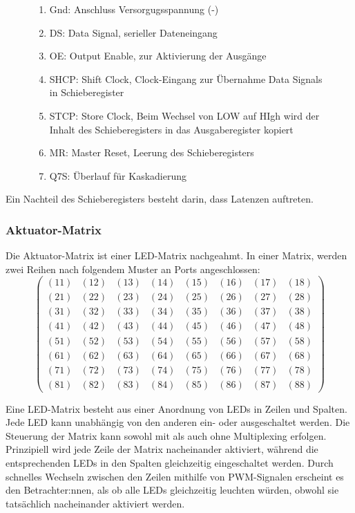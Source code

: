 \begin{figure}[htbp]
\begin{minipage}{0.6\textwidth}
\begin{enumerate}
		\item Gnd: Anschluss Versorgugsspannung (-)
		\item DS: Data Signal, serieller Dateneingang
		\item OE: Output Enable, zur Aktivierung der Ausgänge
		\item SHCP: Shift Clock, Clock-Eingang zur Übernahme Data Signals in Schieberegister
		\item STCP: Store Clock, Beim Wechsel von LOW auf HIgh wird der Inhalt des Schieberegisters in das Ausgaberegister kopiert %
		\item MR: Master Reset, Leerung des Schieberegisters
		\item Q7S: Überlauf für Kaskadierung
	\end{enumerate}
\end{minipage}
\end{figure}
Ein Nachteil des Schieberegisters besteht darin, dass Latenzen auftreten.
\subsubsection{Aktuator-Matrix} %
Die Aktuator-Matrix ist einer LED-Matrix nachgeahmt.
In einer Matrix, werden zwei Reihen nach folgendem Muster an Ports angeschlossen:
$$
\begin{pmatrix}
	(11) & (12) & (13) & (14) & (15) & (16) & (17) & (18) \\
	(21) & (22) & (23) & (24) & (25) & (26) & (27) & (28) \\
	(31) & (32) & (33) & (34) & (35) & (36) & (37) & (38) \\
	(41) & (42) & (43) & (44) & (45) & (46) & (47) & (48) \\
	(51) & (52) & (53) & (54) & (55) & (56) & (57) & (58) \\
	(61) & (62) & (63) & (64) & (65) & (66) & (67) & (68) \\
	(71) & (72) & (73) & (74) & (75) & (76) & (77) & (78) \\
	(81) & (82) & (83) & (84) & (85) & (86) & (87) & (88)
\end{pmatrix}
$$

Eine LED-Matrix besteht aus einer Anordnung von LEDs in Zeilen und Spalten.
Jede LED kann unabhängig von den anderen ein- oder ausgeschaltet werden.
Die Steuerung der Matrix kann sowohl mit als auch ohne Multiplexing erfolgen.
Prinzipiell wird jede Zeile der Matrix nacheinander aktiviert, während die
entsprechenden LEDs in den Spalten gleichzeitig eingeschaltet werden.
Durch schnelles Wechseln zwischen den Zeilen mithilfe von \ac{PWM}-Signalen erscheint es den Betrachter:nnen, als ob alle LEDs
gleichzeitig leuchten würden, obwohl sie tatsächlich nacheinander aktiviert werden.

